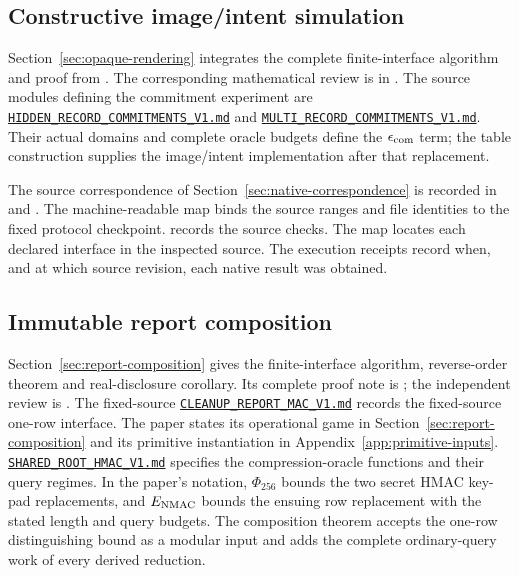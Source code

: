 \documentclass[pdflatex]{sn-jnl}
\theoremstyle{thmstyleone}
\theoremstyle{thmstylethree}
\theoremstyle{thmstyletwo}
\begin{document}
\subsection{Constructive image/intent simulation}
\label{app:opaque-artifacts}

Section~\ref{sec:opaque-rendering} integrates the complete finite-interface
algorithm and proof from .
The corresponding mathematical review is in
. The source
modules defining the commitment experiment are
\href{https://github.com/billlza/q-periapt/blob/228c944fc476e3e57d6c08063cacb19bca5b360e/docs/continuity/HIDDEN_RECORD_COMMITMENTS_V1.md}{\nolinkurl{HIDDEN_RECORD_COMMITMENTS_V1.md}}
and
\href{https://github.com/billlza/q-periapt/blob/228c944fc476e3e57d6c08063cacb19bca5b360e/docs/continuity/MULTI_RECORD_COMMITMENTS_V1.md}{\nolinkurl{MULTI_RECORD_COMMITMENTS_V1.md}}.
Their actual domains and complete oracle budgets define the
$\epsilon_{\rm com}$ term; the table construction supplies the
image/intent implementation after that replacement.

The source correspondence of Section~\ref{sec:native-correspondence} is
recorded in  and
. The machine-readable map binds
the source ranges and file identities to the fixed protocol checkpoint.
 records the
source checks. The map locates each declared interface in the inspected
source. The execution receipts record when, and at which source revision,
each native result was obtained.

\subsection{Immutable report composition}
\label{app:report-artifacts}

Section~\ref{sec:report-composition} gives the finite-interface algorithm,
reverse-order theorem and real-disclosure corollary. Its complete proof note
is ; the independent
review is .
The fixed-source
\href{https://github.com/billlza/q-periapt/blob/228c944fc476e3e57d6c08063cacb19bca5b360e/docs/continuity/CLEANUP_REPORT_MAC_V1.md}{\nolinkurl{CLEANUP_REPORT_MAC_V1.md}}
records the fixed-source one-row interface. The paper states its operational
game in Section~\ref{sec:report-composition} and its primitive instantiation
in Appendix~\ref{app:primitive-inputs}.
\href{https://github.com/billlza/q-periapt/blob/228c944fc476e3e57d6c08063cacb19bca5b360e/docs/continuity/SHARED_ROOT_HMAC_V1.md}{\nolinkurl{SHARED_ROOT_HMAC_V1.md}}
specifies the compression-oracle functions and their query regimes.
In the paper's notation, $\Phi_{256}$ bounds the two secret HMAC key-pad
replacements, and $E_{\rm NMAC}$ bounds the ensuing row replacement with
the stated length and query budgets. The composition theorem accepts the
one-row distinguishing bound as a modular input and adds the complete
ordinary-query work of every derived reduction.
\end{document}
